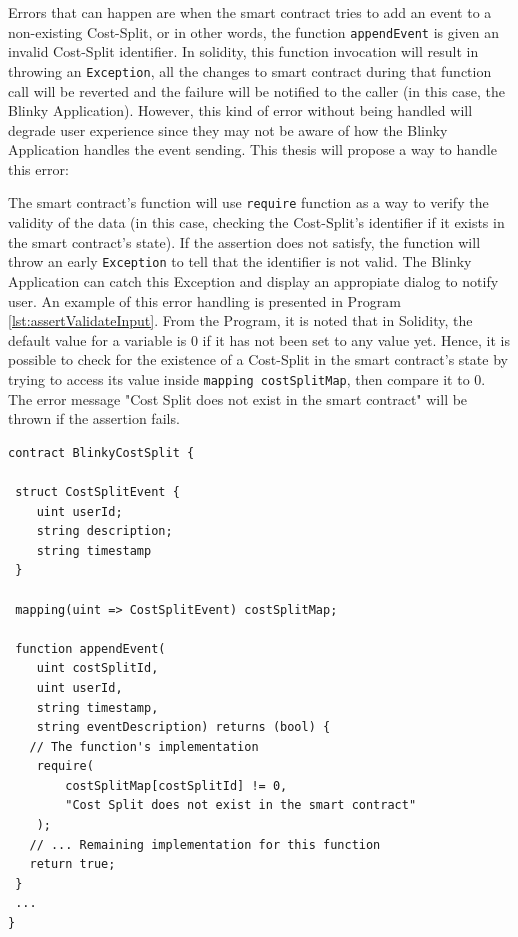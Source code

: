 \documentclass[twoside,numperchapter]{tutthesis} %
\begin{document}
Errors that can happen are when the smart contract tries to add an event to a non-existing Cost-Split, or in other words, the function \texttt{appendEvent} is given an invalid Cost-Split identifier. In solidity, this function invocation will result in throwing an \texttt{Exception}, all the changes to smart contract during that function call will be reverted and the failure will be notified to the caller (in this case, the Blinky Application). However, this kind of error without being handled will degrade user experience since they may not be aware of how the Blinky Application handles the event sending. This thesis will propose a way to handle this error:

 The smart contract's function will use \texttt{require} function as a way to verify the validity of the data (in this case, checking the Cost-Split's identifier if it exists in the smart contract's state). If the assertion does not satisfy, the function will throw an early \texttt{Exception} to tell that the identifier is not valid. The Blinky Application can catch this Exception and display an appropiate dialog to notify user. An example of this error handling is presented in Program \ref{lst:assertValidateInput}. From the Program, it is noted that in Solidity, the default value for a variable is 0 if it has not been set to any value yet. Hence, it is possible to check for the existence of a Cost-Split in the smart contract's state by trying to access its value inside \texttt{mapping costSplitMap}, then compare it to 0. The error message "Cost Split does not exist in the smart contract" will be thrown if the assertion fails.

\begin{lstlisting}[float,caption={Using \texttt{require} function to validate input data},label={lst:assertValidateInput},language=Solidity]
contract BlinkyCostSplit {
 
 struct CostSplitEvent {
    uint userId;
    string description;
    string timestamp
 }
 
 mapping(uint => CostSplitEvent) costSplitMap;
 
 function appendEvent(
    uint costSplitId,
    uint userId,
    string timestamp,
    string eventDescription) returns (bool) {
   // The function's implementation
    require(
        costSplitMap[costSplitId] != 0,
        "Cost Split does not exist in the smart contract"
    );
   // ... Remaining implementation for this function
   return true;
 }
 ...
}
\end{lstlisting}
\end{document}
